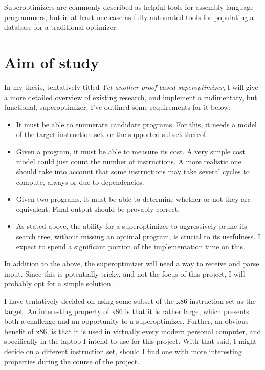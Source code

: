 \documentclass[a4paper,11pt]{kth-mag}
\begin{document}
Superoptimizers are commonly described as helpful tools for assembly language programmers, but in at least one case as fully automated tools for populating a database for a traditional optimizer.

\section*{Aim of study}

In my thesis, tentatively titled \emph{Yet another proof-based superoptimizer},
I will give a more detailed overview of existing research, and implement a rudimentary, but functional, superoptimizer.
I've outlined some requirements for it below:

\begin{itemize}
\item It must be able to enumerate candidate programs. For this, it needs a model of the target instruction set, or the supported subset thereof.
\item Given a program, it must be able to measure its cost. A very simple cost model could just count the number of instructions. A more realistic one should take into account that some instructions may take several cycles to compute, always or due to dependencies.
\item Given two programs, it must be able to determine whether or not they are equivalent. Final output should be provably correct.
\item As stated above, the ability for a superoptimizer to aggressively prune its search tree, without missing an optimal program, is crucial to its usefulness. I expect to spend a significant portion of the implementation time on this.
\end{itemize}

In addition to the above, the superoptimizer will need a way to receive and parse input.
Since this is potentially tricky, and not the focus of this project, I will probably opt for a simple solution.

I have tentatively decided on using some subset of the x86 instruction set as the target.
An interesting property of x86 is that it is rather large, which presents both a challenge and an opportunity to a superoptimizer.
Further, an obvious benefit of x86, is that it is used in virtually every modern personal computer, and specifically in the laptop I intend to use for this project.
With that said, I might decide on a different instruction set, should I find one with more interesting properties during the course of the project.
\end{document}
